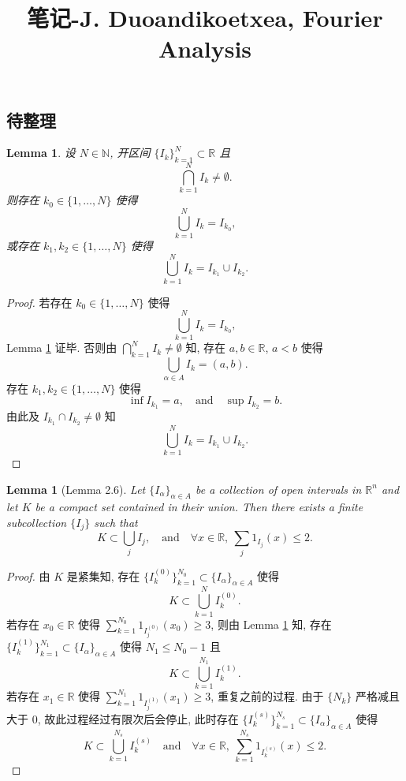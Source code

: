 \documentclass[a4paper,11pt]{article}
\title{笔记-J. Duoandikoetxea, Fourier Analysis}
\newtheorem{lemma}[theorem]{Lemma}
\theoremstyle{definition}
\begin{document}
\begin{CJK*}{UTF8}{gbsn}

\maketitle

\section{待整理}

\begin{lemma} \label{lem1}
    设 $ N \in \mathbb{N} $, 开区间 $ \{I_k\}_{k = 1}^N \subset \mathbb{R} $ 且
    $$
        \bigcap_{k = 1}^N I_k \neq \emptyset.
    $$
    则存在 $ k_0 \in \{1, \ldots, N\} $ 使得
    $$
        \bigcup_{k = 1}^N I_k = I_{k_0},
    $$
    或存在 $ k_1, k_2 \in \{1, \ldots, N\} $ 使得
    $$
        \bigcup_{k = 1}^N I_k = I_{k_1} \cup I_{k_2}.
    $$
\end{lemma}

\begin{proof}
    若存在 $ k_0 \in \{1, \ldots, N\} $ 使得
    $$
        \bigcup_{k = 1}^N I_k = I_{k_0},
    $$
    Lemma \ref{lem1} 证毕. 
    否则由 $ \bigcap_{k = 1}^N I_k \neq \emptyset $ 知, 
    存在 $ a, b \in \mathbb{R} $, $ a < b $ 使得
    $$
        \bigcup_{\alpha \in A} I_k = (a, b).
    $$
    存在 $ k_1, k_2 \in \{1, \ldots, N\} $ 使得
    $$
        \inf I_{k_1} = a, \quad \text{and} \quad \sup I_{k_2} = b.
    $$
    由此及 $ I_{k_1} \cap I_{k_2} \neq \emptyset $ 知
    $$
        \bigcup_{k = 1}^N I_k = I_{k_1} \cup I_{k_2}.
    $$
\end{proof}

\begin{lemma}[Lemma 2.6]
    Let $ \{ I_\alpha \}_{\alpha \in A} $ be a collection of open intervals in $ \mathbb{R}^n $ 
    and let $ K $ be a compact set contained in their union. Then there exists a finite subcollection
    $ \{ I_j \} $ such that
    $$
        K \subset \bigcup_j I_j, \quad \text{and} \quad 
        \forall x \in \mathbb{R},\ \sum_j \mathrm{1}_{I_j} (x) \leq 2.
    $$
\end{lemma}

\begin{proof}
    由 $ K $ 是紧集知, 存在 $ \{I_k^{(0)}\}_{k = 1}^{N_0} \subset \{ I_\alpha \}_{\alpha \in A} $ 使得
    $$
        K \subset \bigcup_{k = 1}^N I_k^{(0)}.
    $$
    若存在 $ x_0 \in \mathbb{R} $ 使得 $ \sum_{k = 1}^{N_0} \mathrm{1}_{I_j^{(0)}} (x_0) \geq 3 $, 
    则由 Lemma \ref{lem1} 知,
    存在 $ \{I_k^{(1)}\}_{k = 1}^{N_1} \subset \{ I_\alpha \}_{\alpha \in A} $ 使得 $ N_1 \leq N_0 - 1 $ 且
    $$
        K \subset \bigcup_{k = 1}^{N_1} I_k^{(1)}.
    $$
    若存在 $ x_1 \in \mathbb{R} $ 使得 $ \sum_{k = 1}^{N_1} \mathrm{1}_{I_j^{(1)}} (x_1) \geq 3 $, 重复之前的过程.
    由于 $ \{N_k\} $ 严格减且大于 $ 0 $,
    故此过程经过有限次后会停止, 此时存在 $ \{I_k^{(s)}\}_{k = 1}^{N_s} \subset \{ I_\alpha \}_{\alpha \in A} $ 使得
    $$
        K \subset \bigcup_{k = 1}^{N_s} I_k^{(s)} \quad \text{and} \quad 
        \forall x \in \mathbb{R},\ \sum_{k = 1}^{N_s} \mathrm{1}_{I_k^{(s)}} (x) \leq 2.
    $$
\end{proof}


\end{CJK*}
\end{document}
